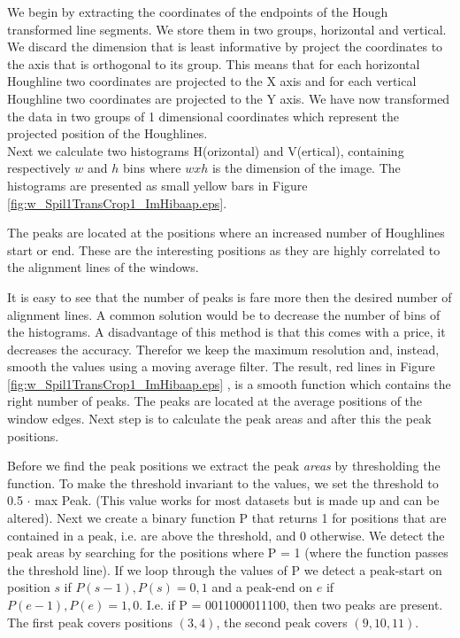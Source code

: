 We begin by extracting the coordinates of the endpoints of the Hough transformed line
segments. We store them in two groups, horizontal and vertical.%
We discard the dimension that is least informative by project the coordinates to
the axis that is orthogonal to its group. 
This means that for each horizontal Houghline two coordinates are projected to the X
axis and for each vertical Houghline two coordinates are projected to the Y
axis. We have now transformed the data in two groups of 1 dimensional
coordinates which represent the projected position of the Houghlines.\\

Next we calculate two histograms H(orizontal) and V(ertical), containing respectively
$w$ and $h$ bins where $w x h$ is the dimension of the image.  The histograms
are presented as small yellow bars in Figure \ref{fig:w_Spil1TransCrop1_ImHibaap.eps}.

The peaks are located at the positions where an increased number of Houghlines
start or end.  These are the interesting positions as they are highly correlated
to the alignment lines of the windows. 

It is easy to see that the number of peaks is fare more then the desired number of alignment lines.
A common solution would be to decrease the number of bins of the histograms. A
disadvantage of this method is that this comes with a price, it decreases the accuracy. Therefor
we keep the maximum resolution and, instead, smooth the values using a moving average filter.
The result, red lines in Figure \ref{fig:w_Spil1TransCrop1_ImHibaap.eps}
, is a smooth function which contains the right number of peaks. The peaks
are located at the average positions of the window edges. Next step is to
calculate the peak areas and after this the peak positions. 

Before we find the peak positions we extract the peak \emph{areas} by thresholding the
function. To make the threshold invariant to the values, we set the threshold to 0.5 $\cdot$ max Peak. 
(This value works for most datasets but is made up and can be altered).
Next we create a binary function P that returns 1 for positions that are contained in
a peak, i.e. are above the threshold, and 0 otherwise.
We detect the peak areas by searching for the positions where P = 1
(where the function passes the threshold line). 
If we loop through the values of P we detect a peak-start on position $s$ if ${P(s-1),P(s)}={0,1}$
and a peak-end on $e$ if ${P(e-1),P(e)}={1,0}$. 
I.e. if P = 0011000011100, then two peaks are present. The first peak covers positions $(3,4)$, 
the second peak covers $(9,10,11)$.\\

